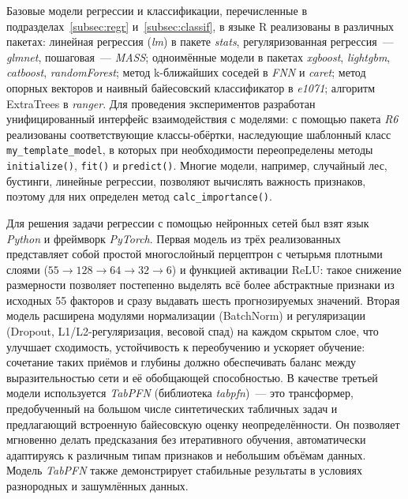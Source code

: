Базовые модели регрессии и классификации, перечисленные в подразделах~\ref{subsec:regr} и~\ref{subsec:classif}, в языке R реализованы в различных пакетах: линейная регрессия (\emph{lm}) в пакете \emph{stats}, регуляризованная регрессия~--- \emph{glmnet}, пошаговая~--- \emph{MASS}; одноимённые модели в пакетах \emph{xgboost}, \emph{lightgbm}, \emph{catboost}, \emph{randomForest}; метод k-ближайших соседей в \emph{FNN} и \emph{caret}; метод опорных векторов и наивный байесовский классификатор в \emph{e1071}; алгоритм ExtraTrees в \emph{ranger}. Для проведения экспериментов разработан унифицированный интерфейс взаимодействия с моделями: с помощью пакета \emph{R6} реализованы соответствующие классы-обёртки, наследующие шаблонный класс \lstinline{my_template_model}, в которых при необходимости переопределены методы \lstinline{initialize()}, \lstinline{fit()} и \lstinline{predict()}. Многие модели, например, случайный лес, бустинги, линейные регрессии, позволяют вычислять важность признаков, поэтому для них определен метод \lstinline{calc_importance()}.

Для решения задачи регрессии с помощью нейронных сетей был взят язык \emph{Python} и фреймворк \emph{PyTorch}. Первая модель из трёх реализованных представляет собой простой многослойный перцептрон с четырьмя плотными слоями ($55 \rightarrow 128 \rightarrow 64 \rightarrow 32 \rightarrow 6$) и функцией активации ReLU: такое снижение размерности позволяет постепенно выделять всё более абстрактные признаки из исходных 55 факторов и сразу выдавать шесть прогнозируемых значений. Вторая модель расширена модулями нормализации (BatchNorm) и регуляризации (Dropout, L1/L2-регуляризация, весовой спад) на каждом скрытом слое, что улучшает сходимость, устойчивость к переобучению и ускоряет обучение: сочетание таких приёмов и глубины должно обеспечивать баланс между выразительностью сети и её обобщающей способностью. В качестве третьей модели используется \emph{TabPFN} (библиотека \emph{tabpfn})~--- это трансформер, предобученный на большом числе синтетических табличных задач и предлагающий встроенную байесовскую оценку неопределённости. Он позволяет мгновенно делать предсказания без итеративного обучения, автоматически адаптируясь к различным типам признаков и небольшим объёмам данных. Модель \emph{TabPFN} также демонстрирует стабильные результаты в условиях разнородных и зашумлённых данных.

